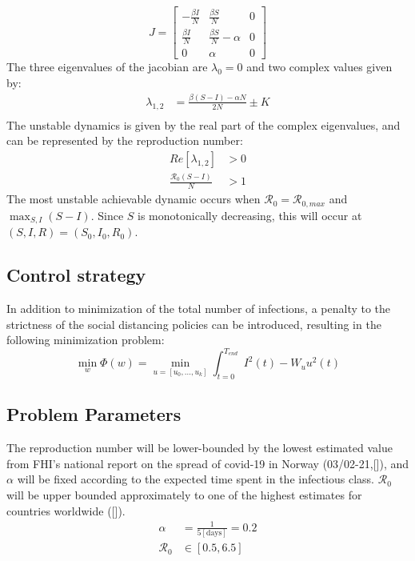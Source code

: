 \begin{equation}
    J = 
    \begin{bmatrix}
    -\frac{\beta I}{N} & \frac{\beta S}{N} & 0\\
    \frac{\beta I}{N} & \frac{\beta S}{N} - \alpha & 0 \\
    0 & \alpha & 0
    \end{bmatrix}
\end{equation}
The three eigenvalues of the jacobian are $\lambda_0 = 0$ and two complex values given by:
\begin{align}
    \lambda_{1,2} &= \frac{\beta(S-I)-\alpha N}{2N}  \pm K\\
\end{align}
The unstable dynamics is given by the real part of the complex eigenvalues, and can be represented by the reproduction number:
\begin{align}
    Re[\lambda_{1,2}] &> 0\\
    \frac{\mathscr{R}_0(S-I)}{N} &> 1
\end{align}
The most unstable achievable dynamic occurs when $\mathscr{R}_0 = \mathscr{R}_{0, max}$ and $\max_{S, I} (S-I)$. Since $S$ is monotonically decreasing, this will occur at $(S, I, R) = (S_0, I_0, R_0)$.

\subsection{Control strategy}
In addition to minimization of the total number of infections, a penalty to the strictness of the social distancing policies can be introduced, resulting in the following minimization problem:
\begin{equation}
    \min_{w} \Phi(w) = \min_{u = [u_0, \dots, u_k]} \int_{t=0}^{T_{end}} I^2(t) - W_u u^2(t)
\end{equation}

\subsection{Problem Parameters}
\label{ch:Problem_Parameters}
The reproduction number will be lower-bounded by the lowest estimated value from FHI's national report on the spread of covid-19 in Norway (03/02-21,[\cite{FHI_report}]), and $\alpha$ will be fixed according to the expected time spent in the infectious class. $\mathscr{R}_0$ will be upper bounded approximately to one of the highest estimates for countries worldwide ([\cite{France_high_R0}]).
\begin{align}
\alpha &= \frac{1}{5[\text{days}]} = 0.2\\
\mathscr{R}_0 &\in [0.5, 6.5]
\end{align}

